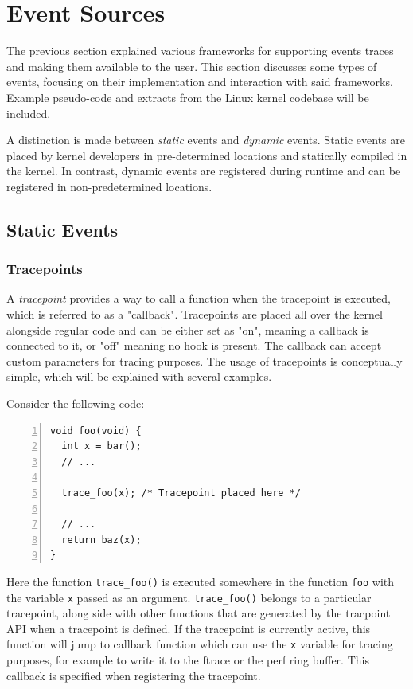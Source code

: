 \section{Event Sources}

The previous section explained various frameworks for supporting events traces
and making them available to the user. This section discusses some types of
events, focusing on their implementation and interaction with said frameworks.
Example pseudo-code and extracts from the Linux kernel codebase will be
included.

A distinction is made between \textit{static} events and \textit{dynamic}
events. Static events are placed by kernel developers in pre-determined
locations and statically compiled in the kernel. In contrast, dynamic events are
registered during runtime and can be registered in non-predetermined locations.

\subsection{Static Events}

\subsubsection*{Tracepoints}

A \textit{tracepoint} provides a way to call a function when the tracepoint is
executed, which is referred to as a "callback". Tracepoints are placed all over
the kernel alongside regular code and can be either set as "on", meaning a
callback is connected to it, or "off" meaning no hook is present. The callback
can accept custom parameters for tracing purposes. The usage of tracepoints is
conceptually simple, which will be explained with several examples.

Consider the following code:

\begin{Verbatim}[numbers=left, numbersep=5pt, frame=single]
void foo(void) {
  int x = bar();
  // ...

  trace_foo(x); /* Tracepoint placed here */

  // ...
  return baz(x);
}
\end{Verbatim}

Here the function \verb|trace_foo()| is executed somewhere in the function
\verb|foo| with the variable \verb|x| passed as an argument. \verb|trace_foo()|
belongs to a particular tracepoint, along side with other functions that are
generated by the tracpoint API when a tracepoint is defined. If the tracepoint
is currently active, this function will jump to callback function which can use
the \verb|x| variable for tracing purposes, for example to write it to the
ftrace or the perf ring buffer. This callback is specified when registering the
tracepoint.

